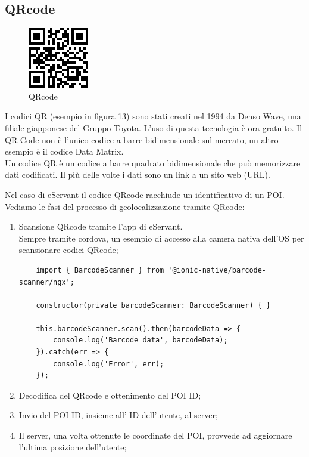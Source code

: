 \subsection{QRcode}
\begin{figure}[H]
    \centering  
    \caption{QRcode}
    \includegraphics[scale=1]{img/cap2/barcode-qrcode}
\end{figure}
I codici QR (esempio in figura 13) sono stati creati nel 1994 da Denso Wave, una filiale giapponese del Gruppo Toyota.
L'uso di questa tecnologia è ora gratuito. Il QR Code non è l'unico codice a barre bidimensionale 
sul mercato, un altro esempio è il codice Data Matrix.
\\
Un codice QR è un codice a barre quadrato bidimensionale che può memorizzare dati codificati. 
Il più delle volte i dati sono un link a un sito web (URL).

Nel caso di eServant il codice QRcode racchiude un identificativo di un POI. \\
Vediamo le fasi del processo di geolocalizzazione tramite QRcode:

\begin{enumerate}
    \item Scansione QRcode tramite l'app di eServant.\\
    Sempre tramite cordova, un esempio di accesso alla camera nativa dell'OS per scansionare
    codici QRcode;
\begin{lstlisting}
    import { BarcodeScanner } from '@ionic-native/barcode-scanner/ngx';
    
    constructor(private barcodeScanner: BarcodeScanner) { }
    
    this.barcodeScanner.scan().then(barcodeData => {
        console.log('Barcode data', barcodeData);
    }).catch(err => {
        console.log('Error', err);
    });
\end{lstlisting}

    \item Decodifica del QRcode e ottenimento del POI ID;
    \item Invio del POI ID, insieme all' ID dell'utente, al server;
    \item Il server, una volta ottenute le coordinate del POI, provvede ad aggiornare l'ultima posizione dell'utente;
\end{enumerate}


